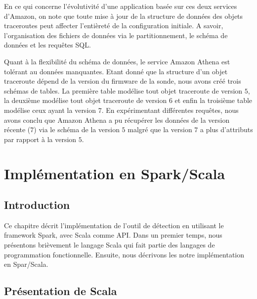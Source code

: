 En ce qui concerne l'évolutivité d'une application basée sur ces deux services d'Amazon, on note que toute mise à jour de la structure de données des objets traceroutes peut affecter l'entièreté de la configuration initiale. A savoir, l'organisation des fichiers de données via le partitionnement, le schéma de données et les requêtes SQL.

Quant à la flexibilité du schéma de données, le service  Amazon Athena est tolérant au données manquantes. Etant donné que la structure d'un objet traceroute dépend de la version du firmware de la sonde, nous avons créé trois schémas de tables. La première table  modélise tout objet traceroute de  version $5$, la deuxième modélise tout objet traceroute de version $6$ et enfin la troisième table modélise ceux ayant la version $7$. En expérimentant différentes requêtes, nous avons conclu  que Amazon Athena a pu récupérer les données de la version récente ($7$) via le schéma de la version $5$ malgré que la version $7$ a plus d'attributs par rapport à la version $5$.




\section{Implémentation  en Spark/Scala} \label{application:spark}
\subsection{Introduction}

Ce chapitre  décrit  l'implémentation de l'outil de détection en utilisant le framework Spark, avec Scala comme API.  Dans un premier temps, nous présentons brièvement le langage Scala qui fait partie des langages de programmation fonctionnelle. Ensuite, nous 
décrivons les notre implémentation en Spar/Scala.

\subsection{Présentation de Scala} \label{scala-presentation}


